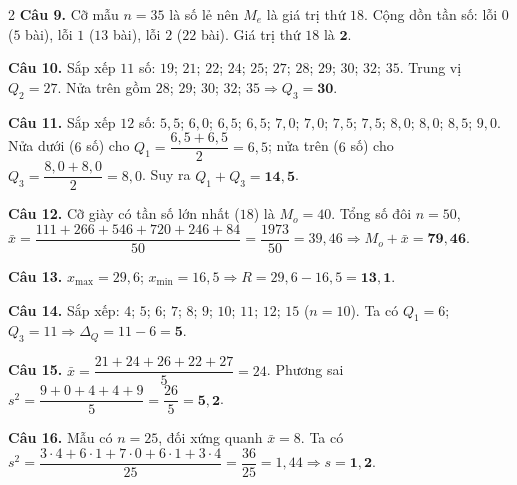 \documentclass[12pt,a4paper]{article}
\begin{document}
\begin{multicols}{2}
\textbf{Câu 9.} Cỡ mẫu $n = 35$ là số lẻ nên $M_e$ là giá trị thứ $18$. Cộng dồn tần số: lỗi $0$ ($5$ bài), lỗi $1$ ($13$ bài), lỗi $2$ ($22$ bài). Giá trị thứ $18$ là $\mathbf{2}$.\par\vspace{3pt}

\textbf{Câu 10.} Sắp xếp $11$ số: $19$; $21$; $22$; $24$; $25$; $27$; $28$; $29$; $30$; $32$; $35$. Trung vị $Q_2 = 27$. Nửa trên gồm $28$; $29$; $30$; $32$; $35 \Rightarrow Q_3 = \mathbf{30}$.\par\vspace{3pt}

\textbf{Câu 11.} Sắp xếp $12$ số: $5{,}5$; $6{,}0$; $6{,}5$; $6{,}5$; $7{,}0$; $7{,}0$; $7{,}5$; $7{,}5$; $8{,}0$; $8{,}0$; $8{,}5$; $9{,}0$. Nửa dưới ($6$ số) cho $Q_1 = \dfrac{6{,}5+6{,}5}{2} = 6{,}5$; nửa trên ($6$ số) cho $Q_3 = \dfrac{8{,}0+8{,}0}{2} = 8{,}0$. Suy ra $Q_1 + Q_3 = \mathbf{14{,}5}$.\par\vspace{3pt}

\textbf{Câu 12.} Cỡ giày có tần số lớn nhất ($18$) là $M_o = 40$. Tổng số đôi $n = 50$, $\bar{x} = \dfrac{111 + 266 + 546 + 720 + 246 + 84}{50} = \dfrac{1973}{50} = 39{,}46 \Rightarrow M_o + \bar{x} = \mathbf{79{,}46}$.\par\vspace{3pt}

\textbf{Câu 13.} $x_{\max} = 29{,}6$; $x_{\min} = 16{,}5 \Rightarrow R = 29{,}6 - 16{,}5 = \mathbf{13{,}1}$.\par\vspace{3pt}

\textbf{Câu 14.} Sắp xếp: $4$; $5$; $6$; $7$; $8$; $9$; $10$; $11$; $12$; $15$ ($n=10$). Ta có $Q_1 = 6$; $Q_3 = 11 \Rightarrow \Delta_Q = 11 - 6 = \mathbf{5}$.\par\vspace{3pt}

\textbf{Câu 15.} $\bar{x} = \dfrac{21+24+26+22+27}{5} = 24$. Phương sai $s^2 = \dfrac{9 + 0 + 4 + 4 + 9}{5} = \dfrac{26}{5} = \mathbf{5{,}2}$.\par\vspace{3pt}

\textbf{Câu 16.} Mẫu có $n = 25$, đối xứng quanh $\bar{x} = 8$. Ta có $s^2 = \dfrac{3\cdot 4 + 6\cdot 1 + 7\cdot 0 + 6\cdot 1 + 3\cdot 4}{25} = \dfrac{36}{25} = 1{,}44 \Rightarrow s = \mathbf{1{,}2}$.\par\vspace{3pt}


\end{multicols}
\end{document}
